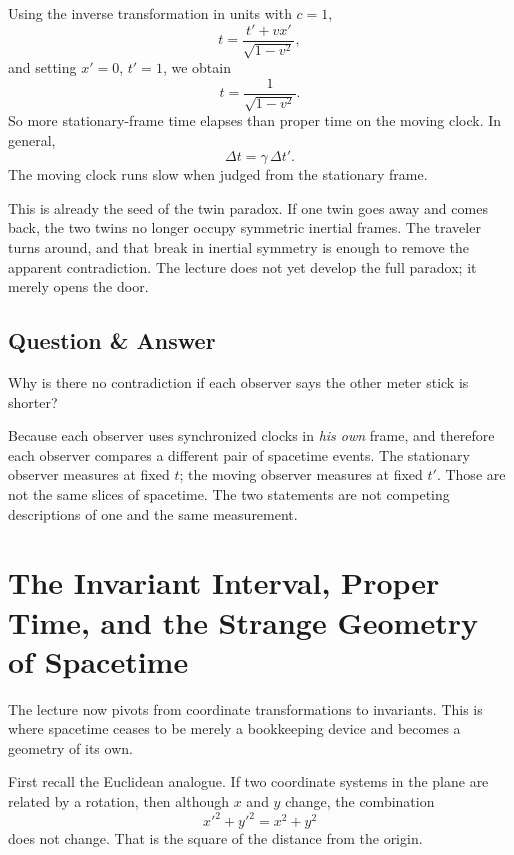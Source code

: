 Using the inverse transformation in units with \(c=1\),
\begin{equation}
t=\frac{t'+vx'}{\sqrt{1-v^2}},
\end{equation}
and setting \(x'=0\), \(t'=1\), we obtain
\begin{equation}
t=\frac{1}{\sqrt{1-v^2}}.
\end{equation}
So more stationary-frame time elapses than proper time on the moving clock. In general,
\begin{equation}
\Delta t=\gamma\,\Delta t'.
\end{equation}
The moving clock runs slow when judged from the stationary frame.

This is already the seed of the twin paradox. If one twin goes away and comes back, the two twins no longer occupy symmetric inertial frames. The traveler turns around, and that break in inertial symmetry is enough to remove the apparent contradiction. The lecture does not yet develop the full paradox; it merely opens the door.

\subsection{Question \& Answer}

Why is there no contradiction if each observer says the other meter stick is shorter?

Because each observer uses synchronized clocks in \emph{his own} frame, and therefore each observer compares a different pair of spacetime events. The stationary observer measures at fixed \(t\); the moving observer measures at fixed \(t'\). Those are not the same slices of spacetime. The two statements are not competing descriptions of one and the same measurement.

\section{The Invariant Interval, Proper Time, and the Strange Geometry of Spacetime}

The lecture now pivots from coordinate transformations to invariants. This is where spacetime ceases to be merely a bookkeeping device and becomes a geometry of its own.

First recall the Euclidean analogue. If two coordinate systems in the plane are related by a rotation, then although \(x\) and \(y\) change, the combination
\begin{equation}
x'^2+y'^2=x^2+y^2
\end{equation}
does not change. That is the square of the distance from the origin.

